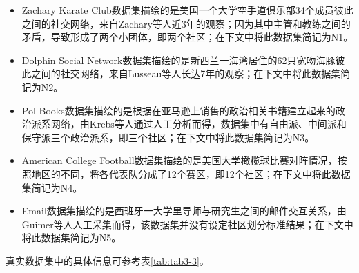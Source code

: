 \begin{itemize}
  \item Zachary Karate Club数据集\cite{Zachary1977An}描绘的是美国一个大学空手道俱乐部34个成员彼此之间的社交网络，来自Zachary等人近3年的观察；因为其中主管和教练之间的矛盾，导致形成了两个小团体，即两个社区；在下文中将此数据集简记为N1。
  \item Dolphin Social Network数据集\cite{Lusseau2004Identifying}描绘的是新西兰一海湾居住的62只宽吻海豚彼此之间的社交网络，来自Lusseau等人长达7年的观察；在下文中将此数据集简记为N2。
  \item Pol Books数据集\cite{Polbooks}描绘的是根据在亚马逊上销售的政治相关书籍建立起来的政治派系网络，由Krebs等人通过人工分析而得，数据集中有自由派、中间派和保守派三个政治派系，即三个社区；在下文中将此数据集简记为N3。
  \item American College Football数据集\cite{football}描绘的是美国大学橄榄球比赛对阵情况，按照地区的不同，将各代表队分成了12个赛区，即12个社区；在下文中将此数据集简记为N4。
  \item Email数据集\cite{snapnets}描绘的是西班牙一大学里导师与研究生之间的邮件交互关系，由Guimer等人人工采集而得，该数据集并没有设定社区划分标准结果；在下文中将此数据集简记为N5。
\end{itemize}

真实数据集中的具体信息可参考表\ref{tab:tab3-3}。






